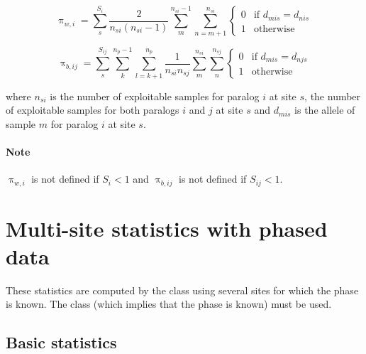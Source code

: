 \documentclass{scrartcl}
\newcommand{\cpp}[1]{{\color{blue}{\texttt{#1}}}}
\begin{document}
\begin{displaymath}
    \uppi_{w,i} =
        \sum_s^{S_i}
            \frac{2}{n_{si}(n_{si}-1)}
            \sum_m^{n_{si}-1}
                \sum_{n=m+1}^{n_{si}}
                    \begin{cases}
                        0 & \text{if } d_{mis} = d_{nis} \\
                        1 & \text{otherwise}
                    \end{cases}
\end{displaymath}

\begin{displaymath}
    \uppi_{b,ij} =
        \sum_s^{S_{ij}}
            \sum_k^{n_p-1}
                \sum_{l=k+1}^{n_p}
                    \frac{1}{n_{si}n_{sj}}
                        \sum_m^{n_{si}}
                            \sum_n^{n_{sj}}
                                \begin{cases}
                                    0 & \text{if } d_{mis} = d_{njs} \\
                                    1 & \text{otherwise}
                                \end{cases}
\end{displaymath}

where $n_{si}$ is the number of exploitable samples for paralog $i$ at
site $s$, the number of exploitable samples for both paralogs $i$ and
$j$ at site $s$ and $d_{mis}$ is the allele of sample $m$ for paralog
$i$ at site $s$.

\paragraph{Note} $\uppi_{w,i}$ is not defined if $S_i < 1$ and
    $\uppi_{b,ij}$ is not defined if $S_{ij} < 1$.


\section{Multi-site statistics with phased data}

These statistics are computed by the \cpp{Diversity2} class using
several sites for which the phase is known. The class \cpp{Site} (which
implies that the phase is known) must be used.


\subsection{Basic statistics}
\end{document}
